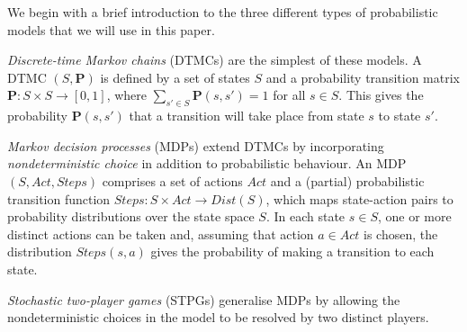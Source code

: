 \documentclass{llncs}
\begin{document}
We begin with a brief introduction to the three different types of probabilistic models
that we will use in this paper.

\vskip5pt
\emph{Discrete-time Markov chains} (DTMCs) are the simplest of these models.
A DTMC $(S,\mathbf{P})$ is defined by a set of states $S$ and a probability transition matrix
$\mathbf{P} : S\times S \rightarrow [0, 1]$, where $\sum_{s'\in S} \mathbf{P}(s, s') = 1$ for all $s \in  S$.
This gives the probability $\mathbf{P}(s, s')$ that a transition will take place from state $s$ to state $s'$.

\vskip5pt
\emph{Markov decision processes} (MDPs) extend DTMCs by incorporating \emph{nondeterministic choice}
in addition to probabilistic behaviour.
An MDP $(S,Act,Steps)$ comprises a set of actions $Act$
and a (partial) probabilistic transition function $Steps:S\times Act\rightarrow Dist(S)$,
which maps state-action pairs to probability distributions over the state space $S$.
In each state $s\in S$, one or more distinct actions can be taken and, assuming that action $a\in Act$ is chosen,
the distribution $Steps(s,a)$ gives the probability of making a transition to each state.



\vskip5pt
\emph{Stochastic two-player games} (STPGs) generalise MDPs by allowing the nondeterministic choices
in the model to be resolved by two distinct players.
\end{document}
